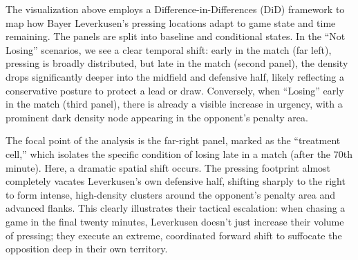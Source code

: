 \documentclass[
]{article}
\begin{document}
The visualization above employs a Difference-in-Differences (DiD)
framework to map how Bayer Leverkusen's pressing locations adapt to game
state and time remaining. The panels are split into baseline and
conditional states. In the ``Not Losing'' scenarios, we see a clear
temporal shift: early in the match (far left), pressing is broadly
distributed, but late in the match (second panel), the density drops
significantly deeper into the midfield and defensive half, likely
reflecting a conservative posture to protect a lead or draw. Conversely,
when ``Losing'' early in the match (third panel), there is already a
visible increase in urgency, with a prominent dark density node
appearing in the opponent's penalty area.

The focal point of the analysis is the far-right panel, marked as the
``treatment cell,'' which isolates the specific condition of losing late
in a match (after the 70th minute). Here, a dramatic spatial shift
occurs. The pressing footprint almost completely vacates Leverkusen's
own defensive half, shifting sharply to the right to form intense,
high-density clusters around the opponent's penalty area and advanced
flanks. This clearly illustrates their tactical escalation: when chasing
a game in the final twenty minutes, Leverkusen doesn't just increase
their volume of pressing; they execute an extreme, coordinated forward
shift to suffocate the opposition deep in their own territory.
\end{document}
